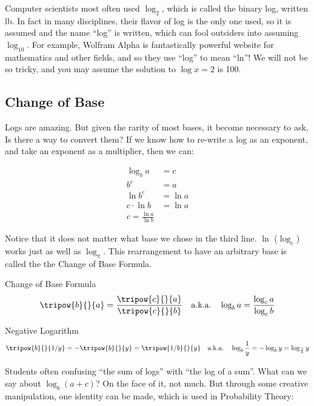 Computer scientists most often used $\log_2$, which is called the binary log,
written lb.  In fact
in many disciplines, their flavor of log is the only one used, so it is assumed and the name
``log'' is written, which can fool outsiders into assuming $\log_{10}$.  For example,
Wolfram Alpha is fantastically powerful website for mathematics and other fields,
and so they use ``log'' to mean ``ln''!  We will not be so tricky, and you may assume
the solution to $\log{x}=2$ is 100.

\subsection{Change of Base}
Logs are amazing.  But given the rarity of most bases, it become necessary to ask,
Is there a way to convert them?  If we know how to re-write a log as an exponent,
and take an exponent as a multiplier, then we can:

\begin{align*}
	\log_b{a} & = c \\
	b^c &= a\\
	\ln{b^c} &= \ln{a}\\
	c \cdot \ln{b} &= \ln{a} \\
	c = \frac{\ln{a}}{\ln{b}} 
\end{align*}

Notice that it does not matter what base we chose in the third line.  $\ln$ ($\log_e$)
works just as well as $\log_{\pi}$.  This rearrangement to have an arbitrary
base is called the the Change of Base Formula.


\begin{derivation}{Change of Base Formula}
$$
\tripow{b}{}{a} = \frac{\tripow{c}{}{a}}{\tripow{c}{}{b}} \quad \text{a.k.a.} \quad
\log_b{a} = \frac{\log_c{a}}{\log_c{b}}
$$
\end{derivation}

\begin{derivation}{Negative Logarithm}
$$
\tripow{b}{}{1/y} = -\tripow{b}{}{y}  = \tripow{1/b}{}{y}
\quad \text{a.k.a.} \quad
\log_b{\frac{1}{y}} = -\log_b{y} = \log_{\frac{1}{b}}{y}
$$
\end{derivation}



Students often confusing ``the sum of logs'' with ``the log of a sum''.  What can we say
about $\log_b{(a+c)}$?  On the face of it, not much.  But through some creative manipulation,
one identity can be made, which is used in Probability Theory:


